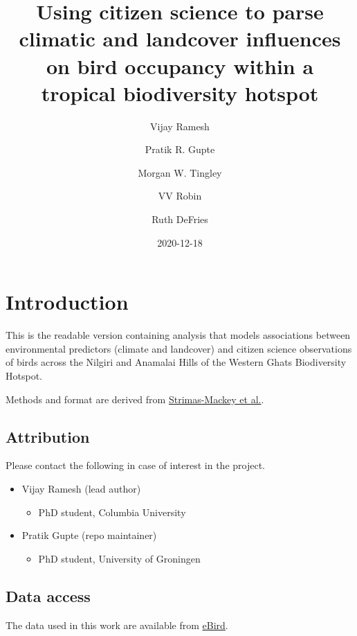 \documentclass[]{article}
\title{Using citizen science to parse climatic and landcover influences on bird occupancy within a tropical biodiversity hotspot}
\author{Vijay Ramesh \and Pratik R. Gupte \and Morgan W. Tingley \and VV Robin \and Ruth DeFries}
\date{2020-12-18}
\providecommand{\tightlist}{%
  \setlength{\itemsep}{0pt}\setlength{\parskip}{0pt}}
\begin{document}
\maketitle

{
\setcounter{tocdepth}{2}
\tableofcontents
}
\hypertarget{introduction}{%
\section{Introduction}\label{introduction}}

This is the readable version containing analysis that models associations between environmental predictors (climate and landcover) and citizen science observations of birds across the Nilgiri and Anamalai Hills of the Western Ghats Biodiversity Hotspot.

Methods and format are derived from \href{https://cornelllabofornithology.github.io/ebird-best-practices/}{Strimas-Mackey et al.}.

\hypertarget{attribution}{%
\subsection{Attribution}\label{attribution}}

Please contact the following in case of interest in the project.

\begin{itemize}
\tightlist
\item
  Vijay Ramesh (lead author)

  \begin{itemize}
  \tightlist
  \item
    PhD student, Columbia University
  \end{itemize}
\item
  Pratik Gupte (repo maintainer)

  \begin{itemize}
  \tightlist
  \item
    PhD student, University of Groningen
  \end{itemize}
\end{itemize}

\hypertarget{data-access}{%
\subsection{Data access}\label{data-access}}

The data used in this work are available from \href{http://ebird.org/data/download}{eBird}.
\end{document}
